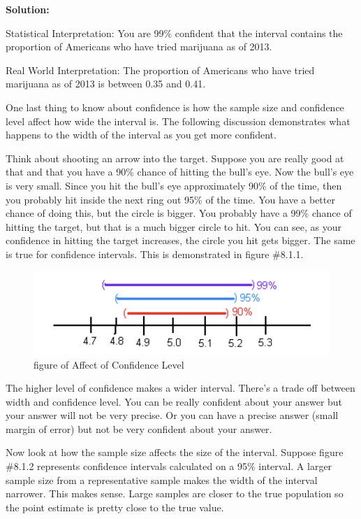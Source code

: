\documentclass[
]{book}
\begin{document}
\textbf{Solution:}

Statistical Interpretation: You are 99\% confident that the interval contains the proportion of Americans who have tried marijuana as of 2013.

Real World Interpretation: The proportion of Americans who have tried marijuana as of 2013 is between 0.35 and 0.41.

One last thing to know about confidence is how the sample size and confidence level affect how wide the interval is. The following discussion demonstrates what happens to the width of the interval as you get more confident.

Think about shooting an arrow into the target. Suppose you are really good at that and that you have a 90\% chance of hitting the bull's eye. Now the bull's eye is very small. Since you hit the bull's eye
approximately 90\% of the time, then you probably hit inside the next ring out 95\% of the time. You have a better chance of doing this, but the circle is bigger. You probably have a 99\% chance of hitting the target, but that is a much bigger circle to hit. You can see, as your confidence in hitting the target increases, the circle you hit gets bigger. The same is true for confidence intervals. This is demonstrated in figure \#8.1.1.

\begin{figure}
\centering
\includegraphics{effect_confidence_level.png}
\caption{figure of Affect of Confidence Level}
\end{figure}

The higher level of confidence makes a wider interval. There's a trade off between width and confidence level. You can be really confident about your answer but your answer will not be very precise. Or you can have a precise answer (small margin of error) but not be very confident about your answer.

Now look at how the sample size affects the size of the interval. Suppose figure \#8.1.2 represents confidence intervals calculated on a 95\% interval. A larger sample size from a representative sample makes the width of the interval narrower. This makes sense. Large samples are closer to the true population so the point estimate is pretty close to the true value.
\end{document}
